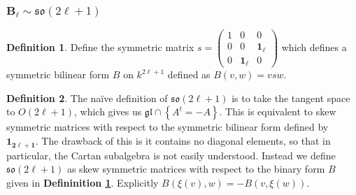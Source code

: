 \documentclass[10.5pt]{article}
\theoremstyle{definition}
\newtheorem{definition}{Definition}
\numberwithin{example}{subsection}
\numberwithin{proposition}{subsection}
\numberwithin{pb}{subsection}
\newcommand{\set}[1]{\left\{#1\right\}}
\begin{document}
    \subsubsection{\(\mathbf{B_\ell} \sim \mathfrak{so}(2\ell + 1)\)}
        \begin{definition}\label{defbinformbl}
            Define the symmetric matrix \(s = \begin{pmatrix}
                1 & 0 & 0 \\ 0 & 0 & \mathbf{1_\ell} \\ 0 & \mathbf{1_\ell} & 0
            \end{pmatrix}\)
            which defines a symmetric bilinear form \(B\) on \(k^{2\ell + 1}\) defined as \(B(v,w) = vsw\).
        \end{definition}
        \begin{definition}\label{defsolodd}
            The na\"ive definition of \(\mathfrak{so}(2\ell + 1)\) is to take the tangent space to \(O(2\ell + 1)\), which gives us \(\mathfrak{gl} \cap \set{A^t = -A}\). This is equivalent to skew symmetric matrices with respect to the symmetric bilinear form defined by \(\mathbf{1_{2\ell + 1}}\). The drawback of this is it contains no diagonal elements, so that in particular, the Cartan subalgebra is not easily understood. Instead we define \(\mathfrak{so}(2\ell + 1)\) as skew symmetric matrices with respect to the binary form \(B\) given in \textbf{Defininition \ref{defbinformbl}}. Explicitly \(B(\xi(v),w) = -B(v,\xi(w))\).
        \end{definition}
        
\end{document}
